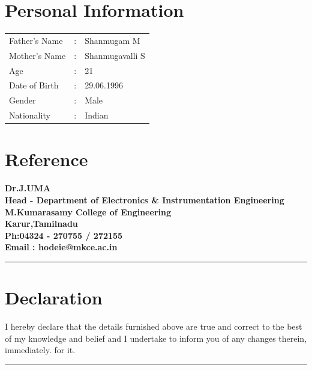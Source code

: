 \documentclass[a4paper,12pt,line]{article}
\begin{document}
	\vspace*{1.5cm}
	
	\newpage
	
	\begin{flushleft}
		\section*{{\color{magenta}Personal Information}}
		\begin{tabular}{lcl}
			Father's Name&:&Shanmugam M\\
			Mother's Name&:&Shanmugavalli S\\
			Age&:&21\\
			Date of Birth&:&29.06.1996\\
			Gender&:&Male\\
			Nationality&:&Indian\\
		\end{tabular}
	
	
	\section*{{\color{magenta}Reference}}
	\textbf{
		Dr.J.UMA\\
		Head - Department of Electronics \& Instrumentation Engineering\\
		M.Kumarasamy College of Engineering\\
		Karur,Tamilnadu\\
		Ph:04324 - 270755 / 272155\\
		Email : hodeie@mkce.ac.in\\}
	
	{\color{yellow} \rule{\linewidth}{0.8mm} }%
	\vspace{-1.5cm}
	\section*{{\color{magenta}Declaration}}
	
	\hspace{1cm}I hereby declare that the details furnished above are true and correct to the best of my knowledge
	and belief and I undertake to inform you of any changes therein, immediately.
	for it. 
	\vspace{5mm}
	{\color{yellow} \rule{\linewidth}{0.8mm} }
	\end{flushleft}
\end{document}
